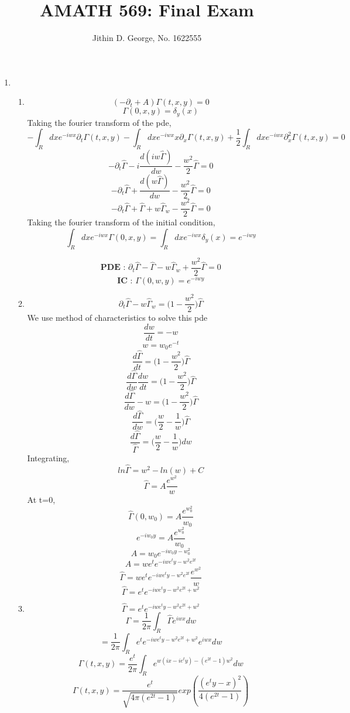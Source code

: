 \documentclass[a4paper,12 pt]{article}
\title{AMATH 569: Final Exam}
\author{Jithin D. George, No. 1622555}
\begin{document}
\maketitle
\begin{enumerate}
	\item
 
 \begin{enumerate}
	
	\item \[(-\partial_t +A)\Gamma(t,x,y)  =0\]
	\[\Gamma(0,x,y) =\delta_y(x)\]
	Taking the fourier transform of the pde,
	\[-\int_R dx e^{-iwx} \partial_t \Gamma(t,x,y) -\int_R dx e^{-iwx} x\partial_x \Gamma(t,x,y)+ \frac{1}{2}\int_R dx e^{-iwx} \partial_x^2 \Gamma(t,x,y) =0\]
		\[-\partial_t\hat{\Gamma} -i \frac{d(iw\hat{\Gamma})}{dw} -\frac{w^2}{2} \hat{\Gamma} =0\]
			\[-\partial_t\hat{\Gamma} + \frac{d(w\hat{\Gamma})}{dw} -\frac{w^2}{2} \hat{\Gamma} =0\]
				\[-\partial_t\hat{\Gamma} + \hat{\Gamma}+w\hat{\Gamma}_w -\frac{w^2}{2} \hat{\Gamma} =0\]
				Taking the fourier transform of the initial condition,
				\[\int_R dx e^{-iwx }\Gamma(0,x,y)=\int_R dx e^{-iwx}\delta_y(x) = e^{-iwy}\]
				
								\[\textbf{PDE :     }   \partial_t\hat{\Gamma} - \hat{\Gamma}-w\hat{\Gamma}_w +\frac{w^2}{2} \hat{\Gamma} =0\]
								\[\textbf{IC :     }  \Gamma(0,w,y)= e^{-iwy}\]


	\item
\[\partial_t\hat{\Gamma} -w\hat{\Gamma}_w  = \big( 1-\frac{w^2}{2} \big) \hat{\Gamma}\]
We use method of characteristics to solve this pde
\[\frac{dw}{dt}=-w\]
\[w=w_0 e^{-t}\]
\[\frac{d\hat{\Gamma}}{dt}= \big( 1-\frac{w^2}{2} \big)\hat{\Gamma}\]
\[\frac{d\hat{\Gamma}}{dw}\frac{dw}{dt}= \big( 1-\frac{w^2}{2} \big) \hat{\Gamma}\]
\[\frac{d\hat{\Gamma}}{dw}-w= \big( 1-\frac{w^2}{2} \big) \hat{\Gamma}\]
\[\frac{d\hat{\Gamma}}{dw}= \big( \frac{w}{2} -\frac{1}{w}\big) \hat{\Gamma}\]
\[\frac{d\hat{\Gamma}}{\hat{\Gamma}}= \big( \frac{w}{2} -\frac{1}{w}\big) d w\]
Integrating,
\[ln{\hat{\Gamma}}=  w^2 -ln(w) +C\]
\[\hat{\Gamma}= A\frac{e^{w^2}}{w}\]
At t=0,
\[\hat{\Gamma}(0,w_0) = A\frac{e^{w_0^2}}{w_0}\]
\[e^{-iw_0y}= A\frac{e^{w_0^2}}{w_0}\]
\[A=w_0e^{-iw_0y-w_0^2}\]
\[A=we^te^{-iwe^ty-w^2e^{2t}}\]
\[ \hat{\Gamma}= we^te^{-iwe^ty-w^2e^{2t}}\frac{e^{w^2}}{w}\]
\hspace{4mm}
\[\boxed{ \hat{\Gamma} = e^te^{-iwe^ty-w^2e^{2t}+w^2}}\]
	\item
\[ \hat{\Gamma} = e^te^{-iwe^ty-w^2e^{2t}+w^2}\]
\[\Gamma = \frac{1}{2\pi}\int_{R} \hat{\Gamma} e^{iwx}dw\]
\[= \frac{1}{2\pi}\int_{R} e^te^{-iwe^ty-w^2e^{2t}+w^2} e^{iwx}dw\]
\[\Gamma(t,x,y)= \frac{e^t}{2\pi}\int_{R} e^{w(ix-ie^ty)-(e^{2t}-1)w^2} dw\]
\[\boxed{\Gamma(t,x,y)= \frac{e^t}{\sqrt{4\pi(e^{2t}-1)}}exp(\frac{(e^ty-x)^2}{4(e^{2t}-1)})}\]


\end{enumerate}
\end{enumerate}
\end{document}
